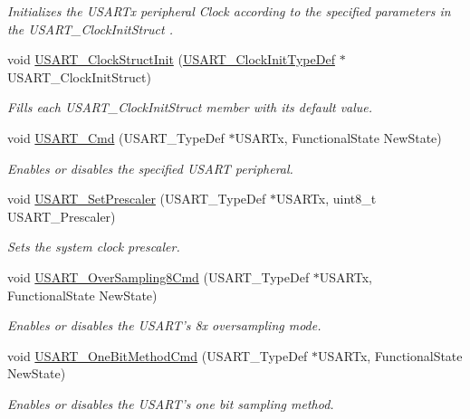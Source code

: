 \begin{DoxyCompactItemize}
\begin{DoxyCompactList}\small\item\em Initializes the U\-S\-A\-R\-Tx peripheral Clock according to the specified parameters in the U\-S\-A\-R\-T\-\_\-\-Clock\-Init\-Struct . \end{DoxyCompactList}\item 
void \hyperlink{group___u_s_a_r_t___group1_ga59df27d0adda18b16ee28d47672cc724}{U\-S\-A\-R\-T\-\_\-\-Clock\-Struct\-Init} (\hyperlink{struct_u_s_a_r_t___clock_init_type_def}{U\-S\-A\-R\-T\-\_\-\-Clock\-Init\-Type\-Def} $\ast$U\-S\-A\-R\-T\-\_\-\-Clock\-Init\-Struct)
\begin{DoxyCompactList}\small\item\em Fills each U\-S\-A\-R\-T\-\_\-\-Clock\-Init\-Struct member with its default value. \end{DoxyCompactList}\item 
void \hyperlink{group___u_s_a_r_t___group1_ga45e51626739c5f22a6567c8a85d1d85e}{U\-S\-A\-R\-T\-\_\-\-Cmd} (U\-S\-A\-R\-T\-\_\-\-Type\-Def $\ast$U\-S\-A\-R\-Tx, Functional\-State New\-State)
\begin{DoxyCompactList}\small\item\em Enables or disables the specified U\-S\-A\-R\-T peripheral. \end{DoxyCompactList}\item 
void \hyperlink{group___u_s_a_r_t___group1_gaf5da8f2eee8245425584d85d4f62cc33}{U\-S\-A\-R\-T\-\_\-\-Set\-Prescaler} (U\-S\-A\-R\-T\-\_\-\-Type\-Def $\ast$U\-S\-A\-R\-Tx, uint8\-\_\-t U\-S\-A\-R\-T\-\_\-\-Prescaler)
\begin{DoxyCompactList}\small\item\em Sets the system clock prescaler. \end{DoxyCompactList}\item 
void \hyperlink{group___u_s_a_r_t___group1_ga3897bab07491d9239f8a238a9a7cddea}{U\-S\-A\-R\-T\-\_\-\-Over\-Sampling8\-Cmd} (U\-S\-A\-R\-T\-\_\-\-Type\-Def $\ast$U\-S\-A\-R\-Tx, Functional\-State New\-State)
\begin{DoxyCompactList}\small\item\em Enables or disables the U\-S\-A\-R\-T's 8x oversampling mode. \end{DoxyCompactList}\item 
void \hyperlink{group___u_s_a_r_t___group1_ga3ed89ea8765d851510cfe90f7d90cbbb}{U\-S\-A\-R\-T\-\_\-\-One\-Bit\-Method\-Cmd} (U\-S\-A\-R\-T\-\_\-\-Type\-Def $\ast$U\-S\-A\-R\-Tx, Functional\-State New\-State)
\begin{DoxyCompactList}\small\item\em Enables or disables the U\-S\-A\-R\-T's one bit sampling method. \end{DoxyCompactList}\end{DoxyCompactItemize}


